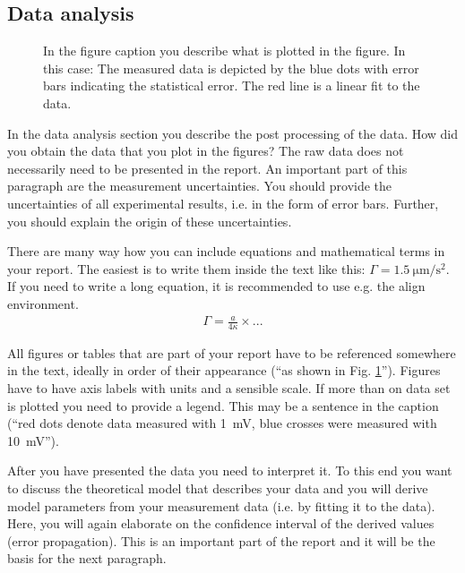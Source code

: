 \subsection{Data analysis}

\begin{figure}
\centering
\caption{In the figure caption you describe what is plotted in the
figure. In this case: The measured data is depicted by the blue dots
with error bars indicating the statistical error. The red line is a
linear fit to the data.} \label{fig1}
\end{figure}

In the data analysis section you describe the post processing of the
data. How did you obtain the data that you plot in the figures? The raw data does not necessarily need
to be presented in the report. An important part of this paragraph
are the measurement uncertainties. You should provide the
uncertainties of all experimental results, i.e. in the form of error
bars. Further, you should explain the origin of these uncertainties.

There are many way how you can include equations and mathematical terms in your report. The easiest is to write them inside the text like this: $\Gamma =\SI{1.5}{\micro\meter\per\square\second}$. If you need to write a long equation, it is recommended to use e.g. the align environment.
\begin{align}
    \Gamma = \frac{a}{4\kappa}\times ...
\end{align}

All figures or tables that are part of your report have to be
referenced somewhere in the text, ideally in order of their
appearance (``as shown in Fig. \ref{fig1}''). Figures have to
have axis labels with units and a sensible scale. If more than on
data set is plotted you need to provide a legend. This may be a sentence in the caption (``red dots denote data measured with \SI{1}{\milli\volt}, blue crosses were measured with \SI{10}{\milli\volt}'').

After you have presented the data you need to interpret it. To this
end you want to discuss the theoretical model that describes your
data and you will derive model parameters from your measurement data
(i.e. by fitting it to the data). Here, you will again elaborate on
the confidence interval of the derived values (error propagation).
This is an important part of the report and it will be the basis for
the next paragraph.